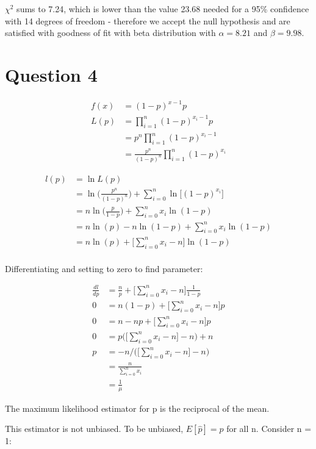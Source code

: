 \documentclass[10pt,a4paper]{article}
\begin{document}
\(\chi^2\) sums to 7.24, which is lower than the value 23.68 needed for a 95\% confidence with 14 degrees of freedom - therefore we accept the null hypothesis and are satisfied with goodness of fit with beta distribution with \(\alpha = 8.21\) and \(\beta = 9.98\).

\newpage
\section*{Question 4}
\begin{align*}
	f(x) &= (1-p)^{x-1}p\\
	L(p) &= \prod_{i=1}^{n}(1-p)^{x_i-1}p\\
	&= p^n\prod_{i=1}^{n}(1-p)^{x_i-1}\\
	&= \frac{p^n}{(1-p)^n}\prod_{i=1}^{n}(1-p)^{x_i}
\end{align*}

\begin{align*}
	l(p) &= \ln L(p)\\
	&= \ln \bigg(\frac{p^n}{(1-p)^n}\bigg) + \sum_{i=0}^{n}\ln\bigg[(1-p)^{x_i}\bigg]\\
	&= n \ln \bigg(\frac{p}{1-p}\bigg) + \sum_{i=0}^{n}x_i\ln(1-p)\\
	&= n \ln (p) - n\ln(1-p) + \sum_{i=0}^{n}x_i\ln(1-p)\\
	&= n \ln (p) + \bigg[\sum_{i=0}^{n}x_i - n\bigg]\ln(1-p)\\
\end{align*}

Differentiating and setting to zero to find parameter:

\begin{align*}
	\frac{dl}{dp} &= \frac{n}{p} + \bigg[\sum_{i=0}^{n}x_i - n\bigg]\frac{1}{1-p}\\
	0 &= n(1-p) + \bigg[\sum_{i=0}^{n}x_i - n\bigg]p\\
	0 &= n - np + \bigg[\sum_{i=0}^{n}x_i - n\bigg]p\\
	0 &= p\bigg(\bigg[\sum_{i=0}^{n}x_i - n\bigg] - n\bigg) + n\\
	p &= -n \bigg/ \bigg(\bigg[\sum_{i=0}^{n}x_i - n\bigg] - n\bigg)\\
	&= \frac{n}{\sum_{i=0}^{n}x_i}\\
	&= \frac{1}{\mu}
\end{align*}

The maximum likelihood estimator for p is the reciprocal of the mean.

This estimator is not unbiased. To be unbiased, \(E[\hat{p}] = p\) for all n. Consider n = 1:
\end{document}
